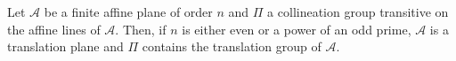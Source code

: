 Let $\mathcal{A}$ be a finite affine plane of order $n$ and $\Pi$ a collineation group transitive on the affine lines of $\mathcal{A}$. Then, if $n$ is either even or a power of an odd prime, $\mathcal{A}$ is a translation plane and $\Pi$ contains the translation group of $\mathcal{A}$.
